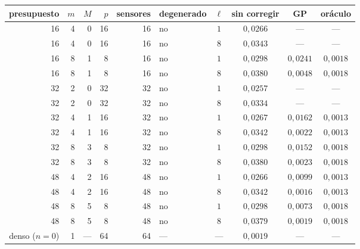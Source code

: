 \begin{tabular}{rrrrrlcccc}
\toprule
presupuesto & $m$ & $M$ & $p$ & sensores & degenerado & $\ell$ & sin corregir & GP & oráculo \\
\midrule
16 & 4 & 0 & 16 & 16 & no & $1$ & $0{,}0266$ & --- & --- \\
16 & 4 & 0 & 16 & 16 & no & $8$ & $0{,}0343$ & --- & --- \\
16 & 8 & 1 & 8 & 16 & no & $1$ & $0{,}0298$ & $0{,}0241$ & $0{,}0018$ \\
16 & 8 & 1 & 8 & 16 & no & $8$ & $0{,}0380$ & $0{,}0048$ & $0{,}0018$ \\
32 & 2 & 0 & 32 & 32 & no & $1$ & $0{,}0257$ & --- & --- \\
32 & 2 & 0 & 32 & 32 & no & $8$ & $0{,}0334$ & --- & --- \\
32 & 4 & 1 & 16 & 32 & no & $1$ & $0{,}0267$ & $0{,}0162$ & $0{,}0013$ \\
32 & 4 & 1 & 16 & 32 & no & $8$ & $0{,}0342$ & $0{,}0022$ & $0{,}0013$ \\
32 & 8 & 3 & 8 & 32 & no & $1$ & $0{,}0298$ & $0{,}0152$ & $0{,}0018$ \\
32 & 8 & 3 & 8 & 32 & no & $8$ & $0{,}0380$ & $0{,}0023$ & $0{,}0018$ \\
48 & 4 & 2 & 16 & 48 & no & $1$ & $0{,}0266$ & $0{,}0099$ & $0{,}0013$ \\
48 & 4 & 2 & 16 & 48 & no & $8$ & $0{,}0342$ & $0{,}0016$ & $0{,}0013$ \\
48 & 8 & 5 & 8 & 48 & no & $1$ & $0{,}0298$ & $0{,}0073$ & $0{,}0018$ \\
48 & 8 & 5 & 8 & 48 & no & $8$ & $0{,}0379$ & $0{,}0019$ & $0{,}0018$ \\
\midrule
denso ($n = 0$) & 1 & --- & 64 & 64 & --- & --- & $0{,}0019$ & --- & --- \\
\bottomrule
\end{tabular}
